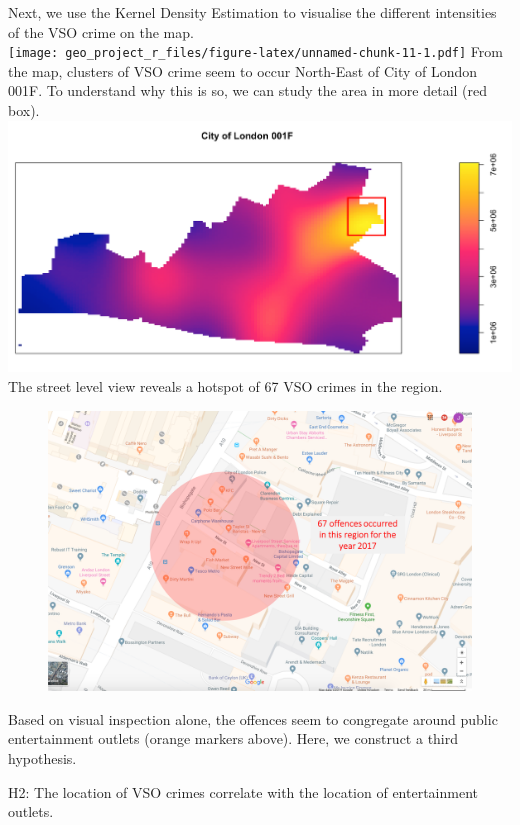 \documentclass[]{article}
\theoremstyle{definition}
\theoremstyle{definition}
\theoremstyle{definition}
\theoremstyle{remark}
\begin{document}
Next, we use the Kernel Density Estimation to visualise the different
intensities of the VSO crime on the map.\\
\texttt{[image: geo\_project\_r\_files/figure-latex/unnamed-chunk-11-1.pdf]}
From the map, clusters of VSO crime seem to occur North-East of City of
London 001F. To understand why this is so, we can study the area in more
detail (red box).\\
\includegraphics{google_map/COL001F_Hotspot_box.png}\\
The street level view reveals a hotspot of 67 VSO crimes in the region.

\begin{figure}
\centering
\includegraphics{google_map/COL001F_Hotspot.png}
\caption{}
\end{figure}

Based on visual inspection alone, the offences seem to congregate around
public entertainment outlets (orange markers above). Here, we construct
a third hypothesis.

H2: The location of VSO crimes correlate with the location of
entertainment outlets.
\end{document}
